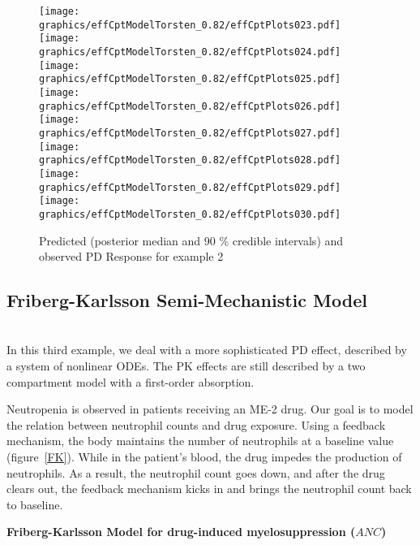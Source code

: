 \documentclass[11pt]{amsart}
\begin{document}
\begin{figure}[htbp]
\texttt{[image: graphics/effCptModelTorsten\_0.82/effCptPlots023.pdf]}
\texttt{[image: graphics/effCptModelTorsten\_0.82/effCptPlots024.pdf]}
\texttt{[image: graphics/effCptModelTorsten\_0.82/effCptPlots025.pdf]}
\texttt{[image: graphics/effCptModelTorsten\_0.82/effCptPlots026.pdf]}
\texttt{[image: graphics/effCptModelTorsten\_0.82/effCptPlots027.pdf]}
\texttt{[image: graphics/effCptModelTorsten\_0.82/effCptPlots028.pdf]}
\texttt{[image: graphics/effCptModelTorsten\_0.82/effCptPlots029.pdf]}
\texttt{[image: graphics/effCptModelTorsten\_0.82/effCptPlots030.pdf]}
\caption{{Predicted (posterior median and 90 \% credible intervals) and observed PD Response for example 2}}
\label{effCptModelPredictionsPD}
\end{figure}

\clearpage

\subsection{Friberg-Karlsson Semi-Mechanistic Model \cite{2364}} \ \\ 

In this third example, we deal with a more sophisticated PD effect, described by a system of nonlinear ODEs. The PK effects are still described by a two compartment model with a first-order absorption. 

Neutropenia is observed in patients receiving an ME-2 drug. Our goal is to model the relation between neutrophil counts and drug exposure. Using a feedback mechanism, the body maintains the number of neutrophils at a baseline value (figure~\ref{FK}). While in the patient's blood, the drug impedes the production of neutrophils. As a result, the neutrophil count goes down, and after  the drug clears out, the feedback mechanism kicks in and brings the neutrophil count back to baseline.

{\bf Friberg-Karlsson Model for drug-induced myelosuppression ($ANC$)}
\end{document}
